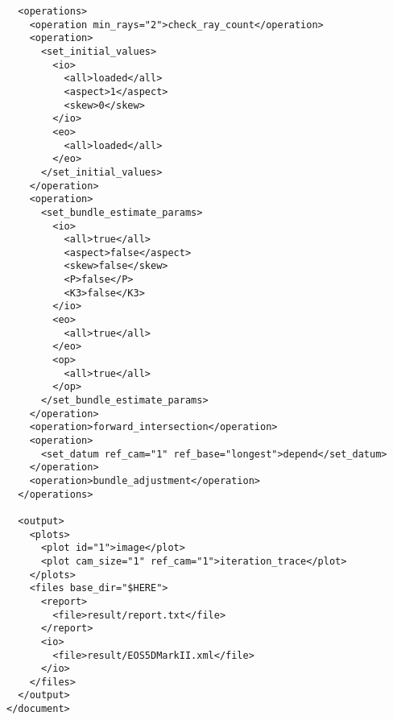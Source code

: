 \documentclass{article}
\begin{document}
\begin{verbatim}
  <operations>
    <operation min_rays="2">check_ray_count</operation>
    <operation>
      <set_initial_values>
        <io>
          <all>loaded</all>
          <aspect>1</aspect>
          <skew>0</skew>
        </io>
        <eo>
          <all>loaded</all>
        </eo>
      </set_initial_values>
    </operation>
    <operation>
      <set_bundle_estimate_params>
        <io>
          <all>true</all>
          <aspect>false</aspect>
          <skew>false</skew>
          <P>false</P>
          <K3>false</K3>
        </io>
        <eo>
          <all>true</all>
        </eo>
        <op>
          <all>true</all>
        </op>
      </set_bundle_estimate_params>
    </operation>
    <operation>forward_intersection</operation>
    <operation>
      <set_datum ref_cam="1" ref_base="longest">depend</set_datum>
    </operation>
    <operation>bundle_adjustment</operation>
  </operations>

  <output>
    <plots>
      <plot id="1">image</plot>
      <plot cam_size="1" ref_cam="1">iteration_trace</plot>
    </plots>
    <files base_dir="$HERE">
      <report>
        <file>result/report.txt</file>
      </report>
      <io>
        <file>result/EOS5DMarkII.xml</file>
      </io>
    </files>
  </output>
</document>
\end{verbatim}

\newpage
\end{document}
